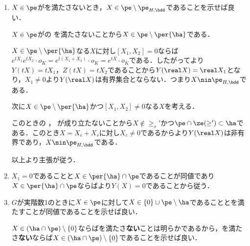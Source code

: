 \begin{npfwn}
  \leavevmode\vspace{-1em}
  \begin{enumerate}[label=\textbf{\arabic*.}]
    
  \item $X\in \pe$がを満たさないとき，$X\in \pe\setminus\pe_{H,\bdd} $であることを示せば良い．
    
    $X\in \pe$がの  を満たさないことから$X\in\pe\setminus\per{\ha} $である．

    $X\in \pe\setminus\per{\ha} $なる$X$に対し$[X_1,X_2] = 0$ならば$e^{tX_1}e^{tX_2}\cdot o_K = e^{t(X_1 + X_2)}\cdot o_K = e^{tX}\cdot o_K$である．したがってより$Y(tX) = tX_1 $，$Z(tX) = tX_2 $であることから$Y(\real X) = \real X_1 $となり，$X_1\neq 0$より$Y(\real X)$は有界集合とならない．つまり$X\nin\pe_{H,\bdd} $である．

    次に$X\in \pe\setminus \per{\ha} $かつ$[X_1,X_2] \neq 0$なる$X$を考える．

    このときの ， が成り立たないことから$X\nin \ge_{s}' $かつ$\pe\cap \ze(\ge')\subset \ha $である．このとき$X = X_c + X_s $に対し$X_c\neq 0$であるからより$Y(\real X)$は非有界であり，$X\nin\pe_{H,\bdd} $である．


    以上より主張が従う．
  \item $X_1 = 0$であることと$ X\in \per{\ha}\cap\pe $であることが同値であり$X\in \per{\ha}\cap\pe $ならばより$Y(X) = 0 $であることから従う．
  \item $G$が実階数1のときに$X\in \pe$に対して$X\in \{0\}\cup \pe\setminus \ha $であることとを満たすことが同値であることを示せば良い．

    $X\in(\ha\cap\pe)\setminus\{0\} $ならばを満たさ\textbf{ない}ことは明らかであるから，を満たさ\textbf{ない}ならば$X\in(\ha\cap\pe)\setminus\{0\} $であることを示せば良い．


\end{enumerate}
\end{npfwn}
